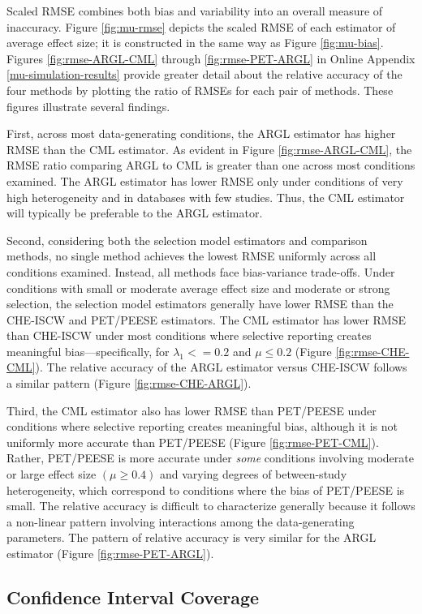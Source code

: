 \documentclass[
  american,
  man, donotrepeattitle,floatsintext]{apa7}
\begin{document}
Scaled RMSE combines both bias and variability into an overall measure of inaccuracy.
Figure \ref{fig:mu-rmse} depicts the scaled RMSE of each estimator of average effect size; it is constructed in the same way as Figure \ref{fig:mu-bias}.
Figures \ref{fig:rmse-ARGL-CML} through \ref{fig:rmse-PET-ARGL} in Online Appendix \ref{mu-simulation-results} provide greater detail about the relative accuracy of the four methods by plotting the ratio of RMSEs for each pair of methods.
These figures illustrate several findings.

First, across most data-generating conditions, the ARGL estimator has higher RMSE than the CML estimator. As evident in Figure \ref{fig:rmse-ARGL-CML}, the RMSE ratio comparing ARGL to CML is greater than one across most conditions examined.
The ARGL estimator has lower RMSE only under conditions of very high heterogeneity and in databases with few studies.
Thus, the CML estimator will typically be preferable to the ARGL estimator.

Second, considering both the selection model estimators and comparison methods, no single method achieves the lowest RMSE uniformly across all conditions examined.
Instead, all methods face bias-variance trade-offs.
Under conditions with small or moderate average effect size and moderate or strong selection, the selection model estimators generally have lower RMSE than the CHE-ISCW and PET/PEESE estimators.
The CML estimator has lower RMSE than CHE-ISCW under most conditions where selective reporting creates meaningful bias---specifically, for \(\lambda_1 <= 0.2\) and \(\mu \leq 0.2\) (Figure \ref{fig:rmse-CHE-CML}).
The relative accuracy of the ARGL estimator versus CHE-ISCW follows a similar pattern (Figure \ref{fig:rmse-CHE-ARGL}).

Third, the CML estimator also has lower RMSE than PET/PEESE under conditions where selective reporting creates meaningful bias, although it is not uniformly more accurate than PET/PEESE (Figure \ref{fig:rmse-PET-CML}).
Rather, PET/PEESE is more accurate under \emph{some} conditions involving moderate or large effect size \((\mu \geq 0.4)\) and varying degrees of between-study heterogeneity,
which correspond to conditions where the bias of PET/PEESE is small.
The relative accuracy is difficult to characterize generally because it follows a non-linear pattern involving interactions among the data-generating parameters.
The pattern of relative accuracy is very similar for the ARGL estimator (Figure \ref{fig:rmse-PET-ARGL}).

\subsection{Confidence Interval Coverage}\label{confidence-interval-coverage}
\end{document}
